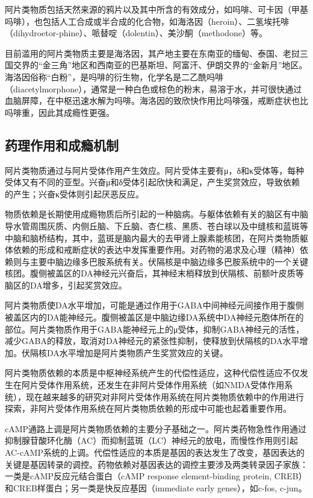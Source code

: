 阿片类物质包括天然来源的鸦片以及其中所含的有效成分，如吗啡、可卡因（甲基吗啡），也包括人工合成或半合成的化合物，如海洛因（heroin）、二氢埃托啡（dihydroetor-phine）、哌替啶（dolentin）、美沙酮（methodone）等。

目前滥用的阿片类物质主要是海洛因，其产地主要在东南亚的缅甸、泰国、老挝三国交界的“金三角”地区和西南亚的巴基斯坦、阿富汗、伊朗交界的“金新月”地区。海洛因俗称“白粉”，是吗啡的衍生物，化学名是二乙酰吗啡（diacetylmorphone），通常是一种白色或棕色的粉末，易溶于水，并可很快通过血脑屏障，在中枢迅速水解为吗啡。海洛因的致欣快作用比吗啡强，戒断症状也比吗啡重，因此其成瘾性更强。

\subsection{药理作用和成瘾机制}

阿片类物质通过与阿片受体作用产生效应。阿片受体主要有μ，δ和κ受体等，每种受体又有不同的亚型。兴奋μ和δ受体引起欣快和满足，产生奖赏效应，导致依赖的产生；兴奋κ受体则引起厌恶反应。

物质依赖是长期使用成瘾物质后所引起的一种脑病。与躯体依赖有关的脑区有中脑导水管周围灰质、内侧丘脑、下丘脑、杏仁核、黑质、苍白球以及中缝核和蓝斑等中脑和脑桥结构，其中，蓝斑是脑内最大的去甲肾上腺素能核团，在阿片类物质躯体依赖的形成和戒断症状的表达中发挥重要作用。对药物的渴求及心理（精神）依赖则与主要中脑边缘多巴胺系统有关。伏隔核是中脑边缘多巴胺系统中的一个关键核团。腹侧被盖区的DA神经元兴奋后，其神经末梢释放到伏隔核、前额叶皮质等脑区的DA增多，引起奖赏效应。

阿片类物质使DA水平增加，可能是通过作用于GABA中间神经元间接作用于腹侧被盖区内的DA能神经元。腹侧被盖区是中脑边缘DA系统中DA神经元胞体所在的部位。阿片类物质作用于GABA能神经元上的μ受体，抑制GABA神经元的活性，减少GABA的释放，取消对DA神经元的紧张性抑制，使释放到伏隔核的DA水平增加。伏隔核DA水平增加是阿片类物质产生奖赏效应的关键。

阿片类物质依赖的本质是中枢神经系统产生的代偿性适应，这种代偿性适应不仅发生在阿片受体作用系统，还发生在非阿片受体作用系统（如NMDA受体作用系统），现在越来越多的研究对非阿片受体作用系统在阿片类物质依赖中的作用进行探索，非阿片受体作用系统在阿片类物质依赖的形成中可能也起着重要作用。

cAMP通路上调是阿片类物质依赖的主要分子基础之一。阿片类药物急性作用通过抑制腺苷酸环化酶（AC）而抑制蓝斑（LC）神经元的放电，而慢性作用则引起AC-cAMP系统的上调。代偿性适应的本质是基因的表达发生了改变，基因表达的关键是基因转录的调控。药物依赖对基因表达的调控主要涉及两类转录因子家族：一类是cAMP反应元结合蛋白（cAMP
response element-binding protein,
CREB）和CREB样蛋白；另一类是快反应基因（immediate early
genes），如c-fos, c-jun。

